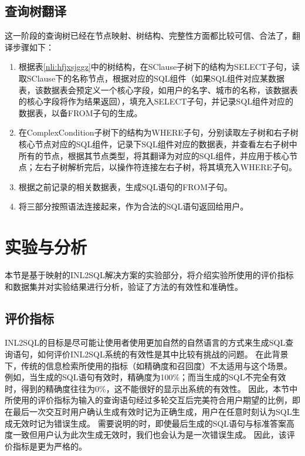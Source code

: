 \subsection{查询树翻译}
\label{nli:cxsfy}
这一阶段的查询树已经在节点映射、树结构、完整性方面都比较可信、合法了，翻译步骤如下：
\begin{enumerate}
    \item 根据表\ref{nli:hfjxsjggz}中的树结构，在SClause子树下的结构为SELECT子句，读取SClause下的名称节点，根据对应的SQL组件（如果SQL组件对应某数据表，该数据表会预定义一个核心字段，如用户的名字、城市的名称，该数据表的核心字段将作为结果返回），填充入SELECT子句，并记录SQL组件对应的数据表，以备FROM子句的生成。
    \item 在ComplexCondition子树下的结构为WHERE子句，分别读取左子树和右子树核心节点对应的SQL组件，记录下SQL组件对应的数据表，并查看左右子树中所有的节点，根据其节点类型，将其翻译为对应的SQL组件，并应用于核心节点；左右子树解析完后，以操作符连接左右子树，将其填充入WHERE子句。
    \item 根据之前记录的相关数据表，生成SQL语句的FROM子句。
    \item 将三部分按照语法连接起来，作为合法的SQL语句返回给用户。
\end{enumerate}

\section{实验与分析}
本节是基于映射的INL2SQL解决方案的实验部分，将介绍实验所使用的评价指标和数据集并对实验结果进行分析，验证了方法的有效性和准确性。
\subsection{评价指标}
INL2SQL的目标是尽可能让使用者使用更加自然的自然语言的方式来生成SQL查询语句，如何评价INL2SQL系统的有效性是其中比较有挑战的问题。
在此背景下，传统的信息检索所使用的指标（如精确度和召回度）不太适用与这个场景。
例如，当生成的SQL语句有效时，精确度为100\%；而当生成的SQL不完全有效时，得到的精确度往往为0\%，这不能很好的显示出系统的有效性。
因此，本节中所使用的评价指标为输入的查询语句经过多轮交互后完美符合用户期望的比例，即在最后一次交互时用户确认生成有效时记为正确生成，用户在任意时刻认为SQL生成无效时记为错误生成。
需要说明的时，即使最后生成的SQL语句与标准答案高度一致但用户认为此次生成无效时，我们也会认为是一次错误生成。
因此，该评价指标是更为严格的。

